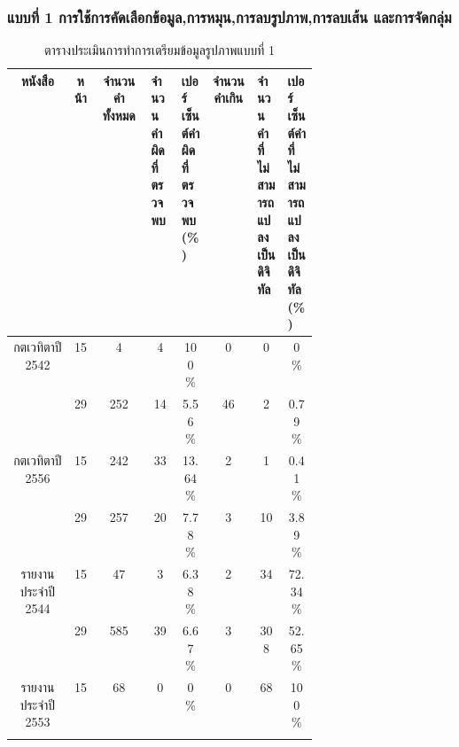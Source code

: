 \subsubsection{แบบที่ 1 การใช้การคัดเลือกข้อมูล,การหมุน,การลบรูปภาพ,การลบเส้น และการจัดกลุ่ม}
\begin{table}[H]
    \caption{ตารางประเมินการทำการเตรียมข้อมูลรูปภาพแบบที่ 1 }\label{tbl:imagep1}
    \begin{tabular}{|c|c|c|p{0.1\linewidth}|p{0.1\linewidth}|c|p{0.1\linewidth}|p{0.1\linewidth}|}
        \hline
        หนังสือ                             & หน้า  & จำนวนคำทั้งหมด & จำนวนคำผิดที่ตรวจพบ & เปอร์เซ็นต์คำผิดที่ตรวจพบ(\%)    & จำนวนคำเกิน & จำนวนคำที่ไม่สามารถแปลงเป็นดิจิทัล & เปอร์เซ็นต์คำที่ไม่สามารถแปลงเป็นดิจิทัล(\%)    \\ \hline
        \multirow{2}{*}{กตเวทิตาปี 2542}      & 15    & 4         & \multicolumn{1}{c|}{4  }         & \multicolumn{1}{c|}{100 \%  } & \multicolumn{1}{c|}{0  }    & \multicolumn{1}{c|}{0  }             & \multicolumn{1}{c|}{0 \%    }\\ \cline{2-8} 
                                            & 29    & 252       & \multicolumn{1}{c|}{14 }         & \multicolumn{1}{c|}{5.56 \% }  &\multicolumn{1}{c|}{46}     &\multicolumn{1}{c|}{2 }              &\multicolumn{1}{c|}{0.79 \%} \\ \hline
        \multirow{2}{*}{กตเวทิตาปี 2556}      & 15    & 242       & \multicolumn{1}{c|}{33 }         & \multicolumn{1}{c|}{13.64 \%}  &\multicolumn{1}{c|}{2 }     &\multicolumn{1}{c|}{1 }              &\multicolumn{1}{c|}{0.41 \%} \\ \cline{2-8} 
                                            & 29    & 257       & \multicolumn{1}{c|}{20 }         & \multicolumn{1}{c|}{7.78 \% } & \multicolumn{1}{c|}{3  }    & \multicolumn{1}{c|}{10 }             & \multicolumn{1}{c|}{3.89 \% }\\ \hline
        \multirow{2}{*}{รายงานประจำปี 2544}   & 15    & 47        & \multicolumn{1}{c|}{3  }         & \multicolumn{1}{c|}{6.38 \% } & \multicolumn{1}{c|}{2  }    & \multicolumn{1}{c|}{34 }             & \multicolumn{1}{c|}{72.34 \%} \\ \cline{2-8} 
                                            & 29    & 585       & \multicolumn{1}{c|}{39 }         & \multicolumn{1}{c|}{6.67 \% } & \multicolumn{1}{c|}{3  }    & \multicolumn{1}{c|}{308}             & \multicolumn{1}{c|}{52.65 \%} \\ \hline
        \multirow{2}{*}{รายงานประจำปี 2553}   & 15    & 68        & \multicolumn{1}{c|}{0  }         & \multicolumn{1}{c|}{0 \%    } & \multicolumn{1}{c|}{0  }    & \multicolumn{1}{c|}{68 }             & \multicolumn{1}{c|}{100 \%  }\\ \cline{2-8} 

\end{tabular}
\end{table}
